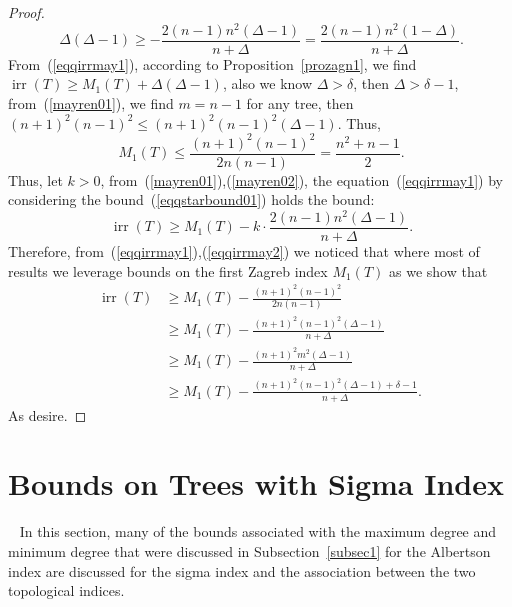 \documentclass[12pt]{amsart}
\newcommand{\irr}{\operatorname{irr}}
\begin{document}
\begin{proof}
\begin{equation}~\label{eqqirrmay1}
    \Delta(\Delta - 1) \geq -\frac{2 (n-1) n^2 (\Delta - 1)}{n + \Delta} = \frac{2 (n-1) n^2 (1 - \Delta)}{n + \Delta}.
\end{equation}
From~(\ref{eqqirrmay1}), according to Proposition~\ref{prozagn1}, we find $\irr(T)\geq M_1(T)+\Delta(\Delta-1)$, also we know $\Delta>\delta$, then $\Delta>\delta-1$,  from~(\ref{mayren01}), we find $m=n-1$ for any tree, then $(n+1)^2(n-1)^2 \leq (n+1)^2(n-1)^2(\Delta-1)$. Thus,
\begin{equation}~\label{mayren02}
M_1(T)\leq \frac{(n+1)^2(n-1)^2}{2n(n-1)}=\frac{n^2 + n - 1}{2}.
\end{equation}
Thus, let $k>0$, from~(\ref{mayren01}),(\ref{mayren02}), the equation~(\ref{eqqirrmay1}) by considering the bound~(\ref{eqqstarbound01}) holds the bound:
\begin{equation}~\label{eqqirrmay2}
    \irr(T) \geq M_1(T) - k \cdot \frac{2 (n-1) n^2 (\Delta - 1)}{n + \Delta}.
\end{equation}
Therefore, from~(\ref{eqqirrmay1}),(\ref{eqqirrmay2}) we noticed that where most of results we leverage bounds on the first Zagreb index $ M_1(T)$ as we show that
\begin{align*}
    \irr(T) &\geq M_1(T)- \frac{(n+1)^2(n-1)^2}{2n(n-1)}\\
    &\geq M_1(T)- \frac{(n+1)^2(n-1)^2(\Delta-1)}{n+\Delta}\\
    &\geq M_1(T)- \frac{(n+1)^2m^2(\Delta-1)}{n+\Delta}\\
    & \geq M_1(T)- \frac{(n+1)^2(n-1)^2(\Delta-1)+\delta-1}{n+\Delta}.
\end{align*}
As desire.
\end{proof}
\section{Bounds on Trees with Sigma Index}~\label{sec4}
In this section, many of the bounds associated with the maximum degree and minimum degree that were discussed in Subsection~\ref{subsec1} for the Albertson index are discussed for the sigma index and the association between the two topological indices.
\end{document}
